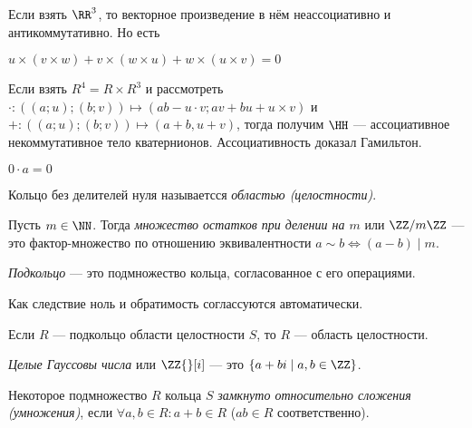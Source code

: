 \documentclass[12pt,a4paper]{article}
\begin{document}
    \begin{example}
        Если взять $\RR^3$, то векторное произведение в нём неассоциативно и антикоммутативно. Но есть
        \begin{lemma*}
            $u\times (v\times w) + v\times (w\times u) + w\times (u\times v) = 0$
        \end{lemma*}
    \end{example}

    \begin{example}
        Если взять $R^4 = R \times R^3$ и рассмотреть $\cdot: ((a; u); (b; v)) \mapsto (ab-u\cdot v; av + bu + u\times v)$ и $+: ((a; u); (b; v)) \mapsto (a + b, u + v)$, тогда получим $\HH$ --- ассоциативное некоммутативное тело кватернионов. Ассоциативность доказал Гамильтон.
    \end{example}

    \begin{lemma*}
        $0 \cdot a = 0$
    \end{lemma*}

    \begin{definition}
        Кольцо без делителей нуля называетсся \emph{областью (целостности)}.
    \end{definition}

    \begin{definition}
        Пусть $m\in\NN$. Тогда \emph{множество остатков при делении на $m$} или $\ZZ/m\ZZ$ --- это фактор-множество по отношению эквивалентности $a\sim b \Leftrightarrow (a-b) \mid m$.
    \end{definition}

    \begin{definition}
        \emph{Подкольцо} --- это подмножество кольца, согласованное с его операциями.

        Как следствие ноль и обратимость соглассуются автоматически.
    \end{definition}

    \begin{statement}
        Если $R$ --- подкольцо области целостности $S$, то $R$ --- область целостности.
    \end{statement}

    \begin{definition}
        \emph{Целые Гауссовы числа} или $\ZZ{}[i]$ --- это $\{a + bi \mid a, b \in \ZZ\}$.
    \end{definition}

    \begin{definition}
        Некоторое подмножество $R$ кольца $S$ \emph{замкнуто относительно сложения (умножения)}, если $\forall a, b \in R: a + b \in R$ ($ab \in R$ соответственно).
    \end{definition}
\end{document}
